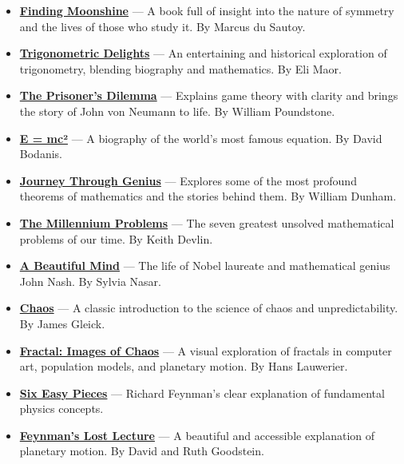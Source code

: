 \documentclass[11pt]{article}
\begin{document}
\begin{itemize}
\item \href{https://isbn.is/9780007214624}{\textbf{Finding Moonshine}} — A book full of insight into the nature of symmetry and the lives of those who study it. By Marcus du Sautoy.

\item \href{https://isbn.is/0691095418}{\textbf{Trigonometric Delights}} — An entertaining and historical exploration of trigonometry, blending biography and mathematics. By Eli Maor.

\item \href{https://isbn.is/9780385415804}{\textbf{The Prisoner's Dilemma}} — Explains game theory with clarity and brings the story of John von Neumann to life. By William Poundstone.

\item \href{https://isbn.is/0333780337}{\textbf{E = mc²}} — A biography of the world's most famous equation. By David Bodanis.

\item \href{https://isbn.is/9780140147391}{\textbf{Journey Through Genius}} — Explores some of the most profound theorems of mathematics and the stories behind them. By William Dunham.

\item \href{https://isbn.is/1862077355}{\textbf{The Millennium Problems}} — The seven greatest unsolved mathematical problems of our time. By Keith Devlin.

\item \href{https://isbn.is/0571212921}{\textbf{A Beautiful Mind}} — The life of Nobel laureate and mathematical genius John Nash. By Sylvia Nasar.

\item \href{https://isbn.is/0749386061}{\textbf{Chaos}} — A classic introduction to the science of chaos and unpredictability. By James Gleick.

\item \href{https://isbn.is/0140144110}{\textbf{Fractal: Images of Chaos}} — A visual exploration of fractals in computer art, population models, and planetary motion. By Hans Lauwerier.

\item \href{https://isbn.is/9780140276664}{\textbf{Six Easy Pieces}} — Richard Feynman’s clear explanation of fundamental physics concepts.

\item \href{https://isbn.is/0099736217}{\textbf{Feynman's Lost Lecture}} — A beautiful and accessible explanation of planetary motion. By David and Ruth Goodstein.


\end{itemize}
\end{document}
